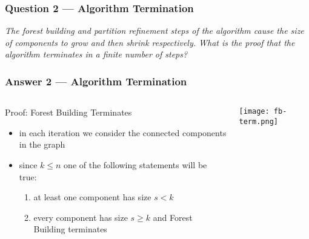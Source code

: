 \begin{frame}
    \frametitle{Question 2 --- Algorithm Termination}
    \textit{The forest building and partition refinement steps of the algorithm cause the size of components to grow and then shrink respectively.\vspace{\baselineskip}
    What is the proof that \alert{the algorithm terminates} in a finite number of steps?}
\end{frame}

\begin{frame}
    \frametitle{Answer 2 --- Algorithm Termination}
    \begin{columns}
        \begin{block}{Proof: Forest Building Terminates}
            \begin{itemize}
                \item in each iteration we consider the connected components in the graph
                \item since \(k \le n\) one of the following statements will be true:
                \begin{enumerate}
                    \item at least one component has size \(s < k\)
                    \item every component has size \(s \ge k\) and Forest Building terminates
                \end{enumerate}
            \end{itemize}
        \end{block}
            \texttt{[image: fb-term.png]}
    \end{columns}
\end{frame}

